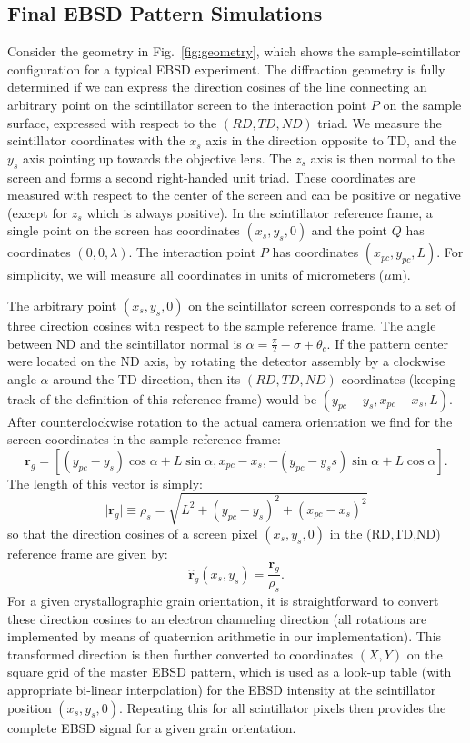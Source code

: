 \documentclass[DIV=calc, paper=letter, fontsize=11pt]{scrartcl}	 %
\begin{document}
\subsection{Final EBSD Pattern Simulations \label{sec:EBSP}}
Consider the geometry in Fig.~\ref{fig:geometry}, which shows the sample-scintillator configuration 
for a typical EBSD experiment.  The diffraction geometry is fully determined if we can express the direction cosines of the line connecting
an arbitrary point on the scintillator screen to the interaction point $P$ on the sample surface, expressed with 
respect to the $(RD,TD,ND)$  triad.  We measure the scintillator coordinates with the $x_s$ axis in the direction 
opposite to TD, and the $y_s$ axis pointing up towards the objective lens.   The $z_s$ axis is then 
normal to the screen and forms a second right-handed unit triad.  These coordinates are measured with 
respect to the center of the screen and can be positive or negative (except for $z_s$ which is always positive).
In the scintillator reference frame, a single point on the screen has coordinates $(x_s,y_s,0)$ and the 
point $Q$ has coordinates $(0,0,\lambda)$.  The interaction point $P$ has coordinates $(x_{pc},y_{pc},L)$.
For simplicity, we will measure all coordinates in units of micrometers ($\mu$m).

The arbitrary point $(x_s,y_s,0)$ on the scintillator screen corresponds to a set of three direction cosines 
with respect to the sample reference frame.   The angle between ND and the scintillator normal is $\alpha=\frac{\pi}{2}-\sigma+\theta_c$.
If the pattern center were located on the ND axis, by rotating the detector assembly by a clockwise angle $\alpha$ around
the TD direction, then its $(RD,TD,ND)$ coordinates (keeping track of the definition of this reference frame) 
would be $(y_{pc}-y_s,x_{pc}-x_s,L)$.  After counterclockwise rotation to the actual camera orientation we 
find for the screen coordinates in the sample reference frame:
\[
	\mathbf{r}_g = \left[ (y_{pc}-y_s)\cos\alpha+L\sin\alpha, x_{pc}-x_s, -(y_{pc}-y_ss)\sin\alpha+L\cos\alpha\right].
\]
The length of this vector is simply:
\[
	\vert \mathbf{r}_g\vert \equiv \rho_s = \sqrt{L^2+(y_{pc}-y_s)^2 + (x_{pc}-x_s)^2}
\]
so that the direction cosines of a screen pixel $(x_s,y_s,0)$ in the (RD,TD,ND) reference frame are given by:
\begin{equation}
	\hat{\mathbf{r}}_g(x_s,y_s) = \frac{\mathbf{r}_g}{\rho_s}.\label{eq:dc}
\end{equation}
For a given crystallographic grain orientation, it is straightforward to convert these
direction cosines to an electron channeling direction (all rotations are implemented by means of quaternion arithmetic in our
implementation).  This transformed direction is then further converted
to coordinates $(X,Y)$ on the square grid of the master EBSD pattern, which is 
used as a look-up table (with appropriate  bi-linear interpolation) for the EBSD intensity at the scintillator
position $(x_s,y_s,0)$.   Repeating this for all scintillator pixels then provides the complete EBSD signal for a given grain orientation.
\end{document}
